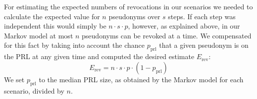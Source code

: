 For estimating the expected numbers of revocations in our scenarios we needed to calculate the expected value for $n$ pseudonyms over $s$ steps. If each step was independent this would simply be $n\cdot s \cdot p$, however, as explained above, in our Markov model at most $n$ pseudonyms can be revoked at a time. We compensated for this fact by taking into account the chance $p_{\mathrm{prl}}$ that a given pseudonym is on the \ac{PRL} at any given time and computed the desired estimate $E_{\mathrm{rev}}$:
\[ E_{\mathrm{rev}}=n\cdot s \cdot p \cdot (1-p_{\mathrm{prl}}) \]
We set $p_{\mathrm{prl}}$ to the median \ac{PRL} size, as obtained by the Markov model for each scenario, divided by $n$.
